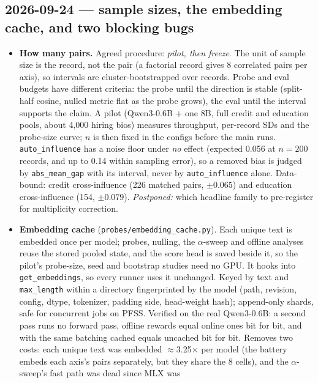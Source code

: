\documentclass{article}
\begin{document}
\subsection*{2026-09-24 --- sample sizes, the embedding cache, and two blocking bugs}
\begin{itemize}
  \item \textbf{How many pairs.} Agreed procedure: \emph{pilot, then freeze}. The unit of sample size is the
        record, not the pair (a factorial record gives 8 correlated pairs per axis), so intervals are
        cluster-bootstrapped over records. Probe and eval budgets have different criteria: the probe until
        the direction is stable (split-half cosine, nulled metric flat as the probe grows), the eval until the
        interval supports the claim. A pilot (Qwen3-0.6B + one 8B, full credit and education pools, about
        4{,}000 hiring bios) measures throughput, per-record SDs and the probe-size curve; $n$ is then fixed in
        the configs before the main runs. \texttt{auto\_influence} has a noise floor under \emph{no} effect
        (expected 0.056 at $n{=}200$ records, and up to 0.14 within sampling error), so a removed bias is
        judged by \texttt{abs\_mean\_gap} with its interval, never by \texttt{auto\_influence} alone.
        Data-bound: credit cross-influence (226 matched pairs, $\pm0.065$) and education cross-influence
        (154, $\pm0.079$). \emph{Postponed:} which headline family to pre-register for multiplicity correction.
  \item \textbf{Embedding cache} (\texttt{probes/embedding\_cache.py}). Each unique text is embedded once per
        model; probes, nulling, the $\alpha$-sweep and offline analyses reuse the stored pooled state, and the
        score head is saved beside it, so the pilot's probe-size, seed and bootstrap studies need no GPU. It
        hooks into \texttt{get\_embeddings}, so every runner uses it unchanged. Keyed by text and
        \texttt{max\_length} within a directory fingerprinted by the model (path, revision, config, dtype,
        tokenizer, padding side, head-weight hash); append-only shards, safe for concurrent jobs on PFSS.
        Verified on the real Qwen3-0.6B: a second pass runs no forward pass, offline rewards equal online ones
        bit for bit, and with the same batching cached equals uncached bit for bit. Removes two costs: each
        unique text was embedded $\approx$3.25$\times$ per model (the battery embeds each axis's pairs
        separately, but they share the 8 cells), and the $\alpha$-sweep's fast path was dead since MLX was

\end{itemize}
\end{document}
